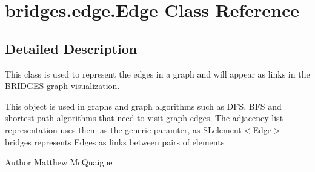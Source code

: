 \hypertarget{classbridges_1_1edge_1_1_edge}{}\section{bridges.\+edge.\+Edge Class Reference}
\label{classbridges_1_1edge_1_1_edge}


\subsection{Detailed Description}
This class is used to represent the edges in a graph and will appear as links in the B\+R\+I\+D\+G\+ES graph visualization. 

This object is used in graphs and graph algorithms such as D\+FS, B\+FS and shortest path algorithms that need to visit graph edges. The adjacency list representation uses them as the generic paramter, as S\+Lelement$<$\+Edge$>$ bridges represents Edges as links between pairs of elements

\begin{DoxyAuthor}{Author}
Matthew Mc\+Quaigue 
\end{DoxyAuthor}
